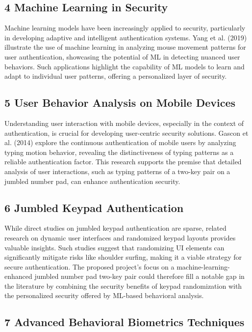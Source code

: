 \documentclass{article}
\begin{document}
\subsection*{4 Machine Learning in Security}

Machine learning models have been increasingly applied to security, particularly in developing adaptive and intelligent authentication systems. Yang et al. (2019) illustrate the use of machine learning in analyzing mouse movement patterns for user authentication, showcasing the potential of ML in detecting nuanced user behaviors. Such applications highlight the capability of ML models to learn and adapt to individual user patterns, offering a personalized layer of security.

\subsection*{5 User Behavior Analysis on Mobile Devices}

Understanding user interaction with mobile devices, especially in the context of authentication, is crucial for developing user-centric security solutions. Gascon et al. (2014) explore the continuous authentication of mobile users by analyzing typing motion behavior, revealing the distinctiveness of typing patterns as a reliable authentication factor. This research supports the premise that detailed analysis of user interactions, such as typing patterns of a two-key pair on a jumbled number pad, can enhance authentication security.

\subsection*{6 Jumbled Keypad Authentication}

While direct studies on jumbled keypad authentication are sparse, related research on dynamic user interfaces and randomized keypad layouts provides valuable insights. Such studies suggest that randomizing UI elements can significantly mitigate risks like shoulder surfing, making it a viable strategy for secure authentication. The proposed project's focus on a machine-learning-enhanced jumbled number pad two-key pair could therefore fill a notable gap in the literature by combining the security benefits of keypad randomization with the personalized security offered by ML-based behavioral analysis.

\subsection*{7 Advanced Behavioral Biometrics Techniques}
\end{document}

